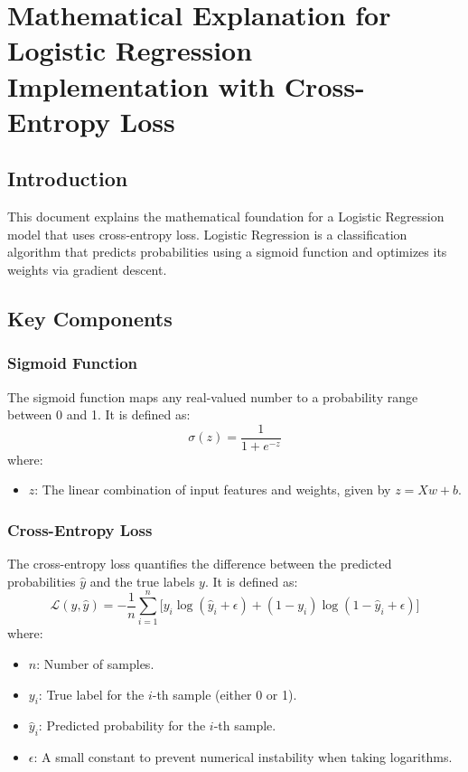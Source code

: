 \documentclass{article}
\begin{document}
\section*{Mathematical Explanation for Logistic Regression Implementation with Cross-Entropy Loss}

\subsection*{Introduction}
This document explains the mathematical foundation for a Logistic Regression model that uses cross-entropy loss. Logistic Regression is a classification algorithm that predicts probabilities using a sigmoid function and optimizes its weights via gradient descent.

\subsection*{Key Components}

\subsubsection*{Sigmoid Function}
The sigmoid function maps any real-valued number to a probability range between 0 and 1. It is defined as:
\[
\sigma(z) = \frac{1}{1 + e^{-z}}
\]
where:
\begin{itemize}
    \item \( z \): The linear combination of input features and weights, given by \( z = Xw + b \).
\end{itemize}

\subsubsection*{Cross-Entropy Loss}
The cross-entropy loss quantifies the difference between the predicted probabilities \( \hat{y} \) and the true labels \( y \). It is defined as:
\[
\mathcal{L}(y, \hat{y}) = -\frac{1}{n} \sum_{i=1}^n \Big[ y_i \log(\hat{y}_i + \epsilon) + (1 - y_i) \log(1 - \hat{y}_i + \epsilon) \Big]
\]
where:
\begin{itemize}
    \item \( n \): Number of samples.
    \item \( y_i \): True label for the \( i \)-th sample (either 0 or 1).
    \item \( \hat{y}_i \): Predicted probability for the \( i \)-th sample.
    \item \( \epsilon \): A small constant to prevent numerical instability when taking logarithms.
\end{itemize}
\end{document}
